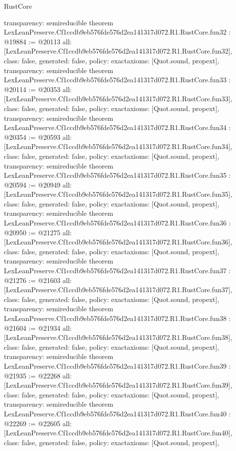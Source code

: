 \begin{lexlean}{RustCore}
\begin{coremodule}
{  transparency: semireducible
}
theorem LexLeanPreserve.Cf1ccdb9eb576fde576d2ea141317d072.R1.RustCore.fun32 : @19884 := @20113 {
  all: [LexLeanPreserve.Cf1ccdb9eb576fde576d2ea141317d072.R1.RustCore.fun32],
  class: false,
  generated: false,
  policy: exact{axioms: [Quot.sound, propext]},
  transparency: semireducible
}
theorem LexLeanPreserve.Cf1ccdb9eb576fde576d2ea141317d072.R1.RustCore.fun33 : @20114 := @20353 {
  all: [LexLeanPreserve.Cf1ccdb9eb576fde576d2ea141317d072.R1.RustCore.fun33],
  class: false,
  generated: false,
  policy: exact{axioms: [Quot.sound, propext]},
  transparency: semireducible
}
theorem LexLeanPreserve.Cf1ccdb9eb576fde576d2ea141317d072.R1.RustCore.fun34 : @20354 := @20593 {
  all: [LexLeanPreserve.Cf1ccdb9eb576fde576d2ea141317d072.R1.RustCore.fun34],
  class: false,
  generated: false,
  policy: exact{axioms: [Quot.sound, propext]},
  transparency: semireducible
}
theorem LexLeanPreserve.Cf1ccdb9eb576fde576d2ea141317d072.R1.RustCore.fun35 : @20594 := @20949 {
  all: [LexLeanPreserve.Cf1ccdb9eb576fde576d2ea141317d072.R1.RustCore.fun35],
  class: false,
  generated: false,
  policy: exact{axioms: [Quot.sound, propext]},
  transparency: semireducible
}
theorem LexLeanPreserve.Cf1ccdb9eb576fde576d2ea141317d072.R1.RustCore.fun36 : @20950 := @21275 {
  all: [LexLeanPreserve.Cf1ccdb9eb576fde576d2ea141317d072.R1.RustCore.fun36],
  class: false,
  generated: false,
  policy: exact{axioms: [Quot.sound, propext]},
  transparency: semireducible
}
theorem LexLeanPreserve.Cf1ccdb9eb576fde576d2ea141317d072.R1.RustCore.fun37 : @21276 := @21603 {
  all: [LexLeanPreserve.Cf1ccdb9eb576fde576d2ea141317d072.R1.RustCore.fun37],
  class: false,
  generated: false,
  policy: exact{axioms: [Quot.sound, propext]},
  transparency: semireducible
}
theorem LexLeanPreserve.Cf1ccdb9eb576fde576d2ea141317d072.R1.RustCore.fun38 : @21604 := @21934 {
  all: [LexLeanPreserve.Cf1ccdb9eb576fde576d2ea141317d072.R1.RustCore.fun38],
  class: false,
  generated: false,
  policy: exact{axioms: [Quot.sound, propext]},
  transparency: semireducible
}
theorem LexLeanPreserve.Cf1ccdb9eb576fde576d2ea141317d072.R1.RustCore.fun39 : @21935 := @22268 {
  all: [LexLeanPreserve.Cf1ccdb9eb576fde576d2ea141317d072.R1.RustCore.fun39],
  class: false,
  generated: false,
  policy: exact{axioms: [Quot.sound, propext]},
  transparency: semireducible
}
theorem LexLeanPreserve.Cf1ccdb9eb576fde576d2ea141317d072.R1.RustCore.fun40 : @22269 := @22605 {
  all: [LexLeanPreserve.Cf1ccdb9eb576fde576d2ea141317d072.R1.RustCore.fun40],
  class: false,
  generated: false,
  policy: exact{axioms: [Quot.sound, propext]},
}
\end{coremodule}
\end{lexlean}
